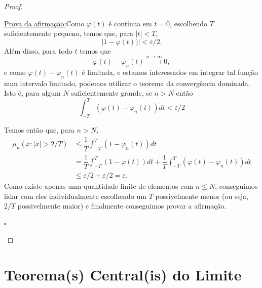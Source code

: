 \documentclass[12pt,a4paper,oneside]{book}
\newenvironment{claimproof}[1]{\par\noindent\underline{Prova da afirma\c{c}\~ao:}\space#1}{\hfill $\square$}
\theoremstyle{definition}
\theoremstyle{remark}
\numberwithin{equation}{section}
\newcommand{\e}{\varepsilon}
\newcommand{\rarrowlimn}{\xrightarrow{n\rightarrow \infty}}
\begin{document}
\begin{proof}
\begin{enumerate}
\begin{claimproof}
Como $\varphi(t)$ é contínua em $t=0$, escolhendo $T$ suficientemente pequeno, temos que, para $|t|<T$,
$$|1-\varphi(t))|<\e/2. $$
Além disso, para todo $t$ temos que
$$\varphi(t) - \varphi_n(t) \rarrowlimn 0, $$
e como $\varphi(t) - \varphi_n(t)$ é limitada, e estamos interessados em integrar tal função num intervalo limitado, podemos utilizar o teorema da convergência dominada. Isto é, para algum $N$ suficientemente grande, se $n>N$ então
$$\int_{-T}^T (\varphi(t)-\varphi_n(t))dt<\e/2 $$

Temos então que, para $n>N$, 
\begin{align*}
\mu_n(x:|x|>2/T)&\leq \dfrac{1}{T}\int_{-T}^T (1-\varphi_n(t))dt\\
& =\dfrac{1}{T}\int_{-T}^T (1-\varphi(t))dt + \dfrac{1}{T}\int_{-T}^T (\varphi(t)-\varphi_n(t))dt\\
&\leq \e/2 + \e/2 = \e. 
\end{align*}
Como existe apenas uma quantidade finite de elementos com  $n\leq N$, conseguimos lidar com eles individualmente escolhendo um $T$ possivelmente menor (ou seja, $2/T$ possivelmente maior) e finalmente conseguimos provar a afirmação.


\end{claimproof}
\end{enumerate}
\end{proof}
































\newpage

\section{Teorema(s) Central(is) do Limite}
\end{document}
